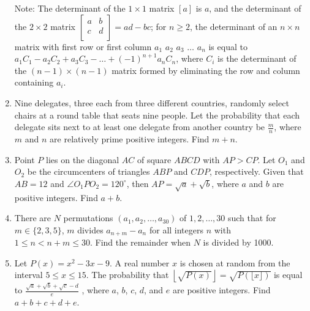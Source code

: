 \documentclass{article}
\begin{document}
\begin{enumerate}[label=\arabic*., itemsep=0.5em]
Note: The determinant of the $1 \times 1$ matrix $[a]$ is $a$, and the determinant of the $2 \times 2$ matrix $\left[ {\begin{array}{cc}
 a & b  \\
 c & d  \\
 \end{array} } \right] = ad - bc$; for $n \ge 2$, the determinant of an $n \times n$ matrix with first row or first column $a_1$ $a_2$ $a_3$ $\dots$ $a_n$ is equal to $a_1C_1 - a_2C_2 + a_3C_3 - \dots + (-1)^{n+1}a_nC_n$, where $C_i$ is the determinant of the $(n - 1) \times (n - 1)$ matrix formed by eliminating the row and column containing $a_i$.\par \vspace{0.5em}\item Nine delegates, three each from three different countries, randomly select chairs at a round table that seats nine people. Let the probability that each delegate sits next to at least one delegate from another country be $\frac{m}{n}$, where $m$ and $n$ are relatively prime positive integers. Find $m + n$.\par \vspace{0.5em}\item Point $P$ lies on the diagonal $AC$ of square $ABCD$ with $AP > CP$. Let $O_1$ and $O_2$ be the circumcenters of triangles $ABP$ and $CDP$, respectively. Given that $AB = 12$ and $\angle O_1PO_2 = 120 ^{\circ}$, then $AP = \sqrt{a} + \sqrt{b}$, where $a$ and $b$ are positive integers. Find $a + b$.\par \vspace{0.5em}\item There are $N$ permutations $(a_1, a_2, \dots, a_{30})$ of $1, 2, \dots, 30$ such that for $m \in \{2,3,5\}$, $m$ divides $a_{n+m} - a_n$ for all integers $n$ with $1 \le n < n+m \le 30$. Find the remainder when $N$ is divided by 1000.\par \vspace{0.5em}\item Let $P(x) = x^2 - 3x - 9$. A real number $x$ is chosen at random from the interval $5 \le x \le 15$. The probability that $\left\lfloor\sqrt{P(x)}\right\rfloor = \sqrt{P(\lfloor x \rfloor)}$ is equal to $\frac{\sqrt{a} + \sqrt{b} + \sqrt{c} - d}{e}$ , where $a$, $b$, $c$, $d$, and $e$ are positive integers. Find $a + b + c + d + e$.\par \vspace{0.5em}\end{enumerate}
\end{document}
